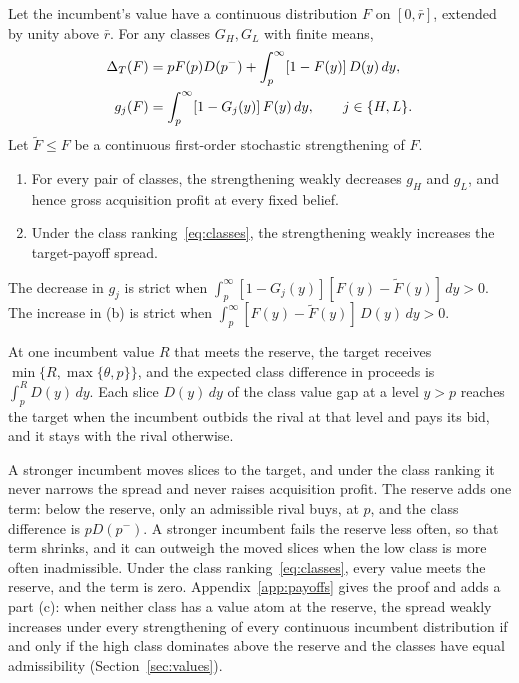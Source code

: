 \begin{proposition}\label{prop:returns}
Let the incumbent's value have a continuous distribution \(F\) on \([0,\bar r]\), extended by unity above
\(\bar r\). For any classes \(G_H,G_L\) with finite means,
\begin{equation}\label{eq:spread}
\begin{aligned}
\Delta_T(F)&=pF(p)D(p^-)+\int_p^\infty[1-F(y)]\,D(y)\,dy,\\
g_j(F)&=\int_p^\infty[1-G_j(y)]\,F(y)\,dy,\qquad j\in\{H,L\}.
\end{aligned}
\end{equation}
Let \(\tilde F\le F\) be a continuous first-order stochastic strengthening of \(F\).
\begin{enumerate}[label=(\alph*),leftmargin=2em]
\item For every pair of classes, the strengthening weakly decreases \(g_H\) and \(g_L\), and hence gross
acquisition profit at every fixed belief.
\item Under the class ranking~\eqref{eq:classes}, the strengthening weakly increases the target-payoff spread.
\end{enumerate}
The decrease in \(g_j\) is strict when \(\int_p^\infty[1-G_j(y)][F(y)-\tilde F(y)]\,dy>0\). The increase in
(b) is strict when \(\int_p^\infty[F(y)-\tilde F(y)]\,D(y)\,dy>0\).
\end{proposition}

At one incumbent value \(R\) that meets the reserve, the target receives
\(\min\{R,\max\{\theta,p\}\}\), and the expected class difference in proceeds is \(\int_p^RD(y)\,dy\). Each
slice \(D(y)\,dy\) of the class value gap at a level \(y>p\) reaches the target when the incumbent outbids
the rival at that level and pays its bid, and it stays with the rival otherwise.

A stronger incumbent moves slices to the target, and under the class ranking it never narrows the spread and never
raises acquisition profit. The
reserve adds one term: below the reserve, only an admissible rival buys, at \(p\), and the class
difference is \(pD(p^-)\). A stronger incumbent fails the reserve less often, so that term shrinks, and it
can outweigh the moved slices when the low class is more often inadmissible. Under the class
ranking~\eqref{eq:classes}, every value meets the reserve, and the term is zero.
Appendix~\ref{app:payoffs} gives the proof and adds a part (c): when neither class has a value atom at the reserve,
the spread weakly increases under every strengthening of every continuous incumbent distribution if and only if
the high class dominates above the reserve and the classes have equal admissibility (Section~\ref{sec:values}).

